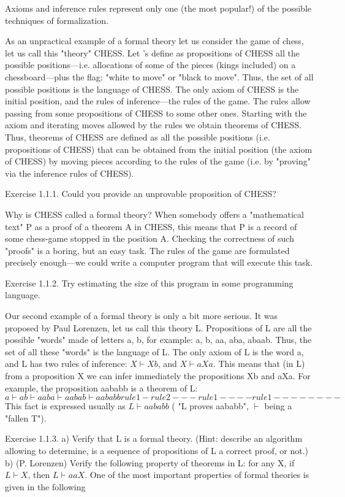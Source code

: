 Axioms and inference rules represent only one (the most popular!) of the possible techniques of formalization.

As an unpractical example of a formal theory let us consider the game of chess, let us call this "theory" CHESS. Let 's define as propositions of CHESS all the possible positions---i.e. allocations of some of the pieces (kings included) on a chessboard---plus the flag: "white to move" or "black to move". Thus, the set of all possible positions is the language of CHESS. The only axiom of CHESS is the initial position, and the rules of inference---the rules of the game. The rules allow passing from some propositions of CHESS to some other ones. Starting with the axiom and iterating moves allowed by the rules we obtain theorems of CHESS. Thus, theorems of CHESS are defined as all the possible positions (i.e. propositions of CHESS) that can be obtained from the initial position (the axiom of CHESS) by moving pieces according to the rules of the game (i.e. by "proving" via the inference rules of CHESS).

Exercise 1.1.1. Could you provide an unprovable proposition of CHESS?

Why is CHESS called a formal theory? When somebody offers a "mathematical text" P as a proof of a theorem A in CHESS, this means that P is a record of some chess-game stopped in the position A.  Checking the correctness of such "proofs" is a boring, but an easy task. The rules of the game are formulated precisely enough---we could write a computer program that will execute this task.

Exercise 1.1.2. Try estimating the size of this program in some programming language.

Our second example of a formal theory is only a bit more serious. It was proposed by Paul Lorenzen, let us call this theory L. Propositions of L are all the possible "words" made of letters a, b, for example: a, b, aa, aba, abaab. Thus, the set of all these "words" is the language of L. The only axiom of L is the word a, and L has two rules of inference: \(X \vdash Xb\), and \(X \vdash aXa\). This means that (in L) from a proposition X we can infer immediately the propositions Xb and aXa. For example, the proposition aababb is a theorem of L:
\[
a \vdash ab \vdash aaba \vdash aabab \vdash aababb
rule1- rule2---rule1----rule1--------
\]
This fact is expressed usually as \(L \vdash aababb\) ( "L proves aababb", \(\vdash\) being a "fallen T").

Exercise 1.1.3. a) Verify that L is a formal theory. (Hint: describe an algorithm allowing to determine, is a sequence of propositions of L a correct proof, or not.) b) (P. Lorenzen) Verify the following property of theorems in L: for any X, if \(L \vdash X\), then \(L \vdash aaX\).
One of the most important properties of formal theories is given in the following

